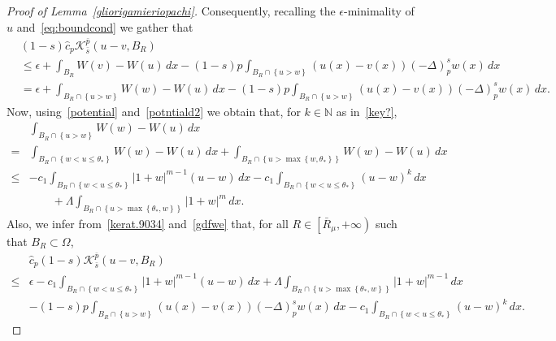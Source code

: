 \documentclass[12pt]{article}
\newcommand{\N}{\mathbb{N}}
\numberwithin{equation}{section}
\renewcommand{\leq}{\leqslant}
\begin{document}
\begin{proof}[Proof of Lemma~\ref{gliorigamieriopachi}]
Consequently, recalling the $\epsilon$-minimality of $u$ and~\eqref{eq:boundcond} we gather that 
\begin{equation}\label{kerat.9034}
\begin{split}&\!\!\!\!\!\!
(1-s)\hat{c}_p \mathcal{K}_{\bar{s}}^{\bar{p}}(u-v, B_R) \\ &\leq \epsilon+\int_{B_R} W(v)-W(u)\,dx-(1-s)p\int_{B_R\cap \left\lbrace u>w\right\rbrace}(u(x)-v(x))(-\Delta)_p^s w(x)\,dx\\
&=\epsilon+\int_{B_R \cap \left\lbrace u>w \right\rbrace} W(w)-W(u)\,dx-(1-s)p\int_{B_R\cap \left\lbrace u>w\right\rbrace}(u(x)-v(x))(-\Delta)_p^s w(x)\,dx.
\end{split}
\end{equation}
Now, using~\eqref{potential} and~\eqref{potntiald2} we obtain that, for $k\in\N$ as in~\eqref{key?},
\begin{equation}\label{gdfwe}
\begin{split}
& \int_{B_R\cap \left\lbrace u>w \right\rbrace} W(w)-W(u)\,dx\\
=& \int_{B_R\cap \left\lbrace w<u\leq \theta_* \right\rbrace} W(w)-W(u)\,dx+\int_{B_R\cap \left\lbrace u>\max\left\lbrace w,\theta_*\right\rbrace \right\rbrace} W(w)-W(u)\,dx\\
\leq & -c_1\int_{B_R\cap \left\lbrace w<u\leq \theta_* \right\rbrace}\left|1+w\right|^{m-1}(u-w)\,dx -c_1\int_{B_R\cap \left\lbrace w<u\leq \theta_* \right\rbrace}(u-w)^k\,dx \\  
&\qquad+ \Lambda \int_{B_R\cap \left\lbrace u>\max\left\lbrace \theta_*,w \right\rbrace   \right\rbrace} \left|1+w\right|^m \,dx.
\end{split}
\end{equation}
Also, we infer from~\eqref{kerat.9034} and~\eqref{gdfwe} that, for all $R\in\left[\bar{R}_\mu,+\infty \right)$ such that $B_R\subset \Omega$,
\begin{equation*}
\begin{split}
&\hat{c}_p(1-s)\mathcal{K}_{\bar{s}}^{\bar{p}}(u-v, B_R)\\ 
\leq & \epsilon-c_1\int_{B_R\cap \left\lbrace w<u\leq \theta_* \right\rbrace}\left|1+w\right|^{m-1}(u-w)\,dx+ \Lambda \int_{B_R\cap \left\lbrace u>\max\left\lbrace \theta_*,w \right\rbrace   \right\rbrace} \left|1+w\right|^{m-1} \,dx\\
&-(1-s)p\int_{B_R\cap \left\lbrace u>w\right\rbrace}(u(x)-v(x))(-\Delta)_p^s w(x)\,dx-c_1\int_{B_R\cap \left\lbrace w<u\leq \theta_* \right\rbrace}(u-w)^k\,dx.
\end{split}

\end{equation*}
\end{proof}
\end{document}
